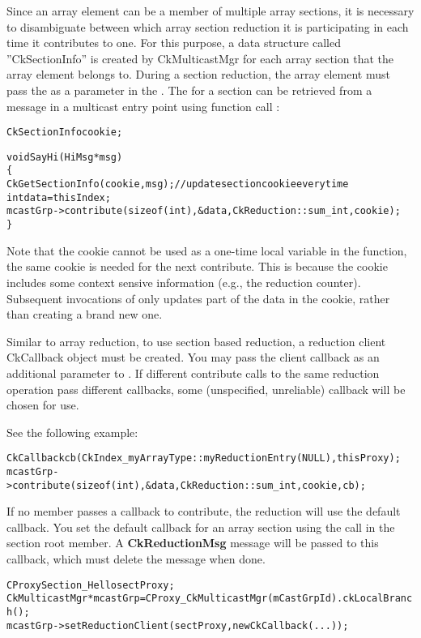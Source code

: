 Since an array element can be a member of multiple array sections, 
it is necessary to disambiguate between which array
section reduction it is participating in each time it contributes to one. For this purpose, a data structure 
called ''CkSectionInfo'' is created by CkMulticastMgr for each 
array section that the array element belongs to.
During a section reduction, the array element must pass the 
 as a parameter in the . 
The  for a section can be retrieved
from a message in a multicast entry point using function call 
:

\begin{alltt}
  CkSectionInfo cookie;

  void SayHi(HiMsg *msg)
  \{
    CkGetSectionInfo(cookie, msg);     // update section cookie every time
    int data = thisIndex;
    mcastGrp->contribute(sizeof(int), &data, CkReduction::sum_int, cookie);
  \}
\end{alltt}

Note that the cookie cannot be used as a one-time local variable in the 
function, the same cookie is needed for the next contribute. This is 
because the cookie includes some context sensive information (e.g., the 
reduction counter). Subsequent invocations of  only updates part of the data in the cookie, rather than creating a brand new one.

Similar to array reduction, to use section based reduction, a
reduction client CkCallback object must be created. You may pass the
client callback as an additional parameter to . If
different contribute calls to the same reduction operation pass
different callbacks, some (unspecified, unreliable) callback will be
chosen for use. 

See the following example:

\begin{alltt}
    CkCallback cb(CkIndex_myArrayType::myReductionEntry(NULL),thisProxy); 
    mcastGrp->contribute(sizeof(int), &data, CkReduction::sum_int, cookie, cb);
\end{alltt}

If no member passes a callback to contribute, the reduction will use the 
default callback. You set the default callback for an array section using the 
 call in the section root member. A 
{\bf CkReductionMsg} message will be passed to this callback, which 
must delete the message when done.

\begin{alltt}
  CProxySection_Hello sectProxy;
  CkMulticastMgr *mcastGrp = CProxy_CkMulticastMgr(mCastGrpId).ckLocalBranch();
  mcastGrp->setReductionClient(sectProxy, new CkCallback(...));
\end{alltt}

